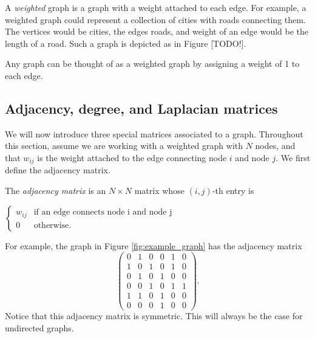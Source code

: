 A \emph{weighted} graph is a graph with a weight attached to each edge.
For example, a weighted graph could represent a collection of cities with roads connecting them.
The vertices would be cities, the edges roads, and weight of an edge would be the length of a road.
Such a graph is depicted as in Figure [TODO!].

Any graph can be thought of as a weighted graph by assigning a weight of 1 to each edge.

\subsection*{Adjacency, degree, and Laplacian matrices}
We will now introduce three special matrices associated to a graph. 
Throughout this section, assume we are working with a weighted graph with $N$ nodes, and that $w_{ij}$ is the weight attached to the edge connecting node $i$ and node $j$.
We first define the adjacency matrix.

\begin{definition} The \emph{adjacency matrix} is an $N \times N$ matrix whose $(i,j)$-th entry is
\begin{center}
	$ \begin{cases}  w_{ij} & \mbox{if an edge connects node i and node j} \\ 0 & \mbox{otherwise.} \end{cases}$
\end{center}
\end{definition}

For example, the graph in Figure \ref{fig:example_graph} has the adjacency matrix
\[
\begin{pmatrix}
0 & 1 & 0 & 0 & 1 & 0\\
1 & 0 & 1 & 0 & 1 & 0\\
0 & 1 & 0 & 1 & 0 & 0\\
0 & 0 & 1 & 0 & 1 & 1\\
1 & 1 & 0 & 1 & 0 & 0\\
0 & 0 & 0 & 1 & 0 & 0
\end{pmatrix}.
\]
Notice that this adjacency matrix is symmetric. This will always be the case for undirected graphs.

